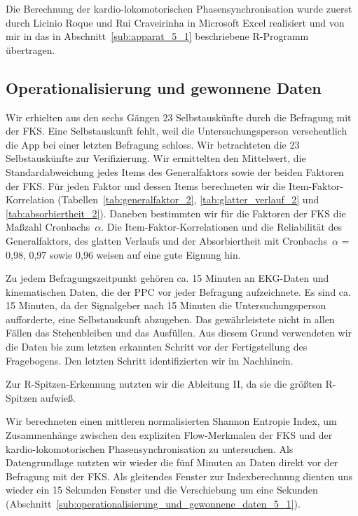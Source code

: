 Die Berechnung der kardio-lokomotorischen Phasensynchronisation wurde zuerst durch Licinio Roque und Rui Craveirinha in Microsoft Excel realisiert und von mir in das in Abschnitt~\ref{sub:apparat_5_1} beschriebene R-Programm übertragen. 

\subsection{Operationalisierung und gewonnene Daten} 

\label{sub:operationalisierung_und_gewonnene_daten_5_2}

Wir erhielten aus den sechs Gängen 23 Selbstauskünfte durch die Befragung mit der \ac{FKS}. Eine Selbstauskunft fehlt, weil die Untersuchungsperson versehentlich die App bei einer letzten Befragung schloss. Wir betrachteten die 23 Selbstauskünfte zur Verifizierung. Wir ermittelten den Mittelwert, die Standardabweichung jedes Items des Generalfaktors sowie der beiden Faktoren der \ac{FKS}. Für jeden Faktor und dessen Items berechneten wir die Item-Faktor-Korrelation (Tabellen~\ref{tab:generalfaktor_2}, \ref{tab:glatter_verlauf_2} und \ref{tab:absorbiertheit_2}). Daneben bestimmten wir für die Faktoren der \ac{FKS} die Maßzahl Cronbachs~$\alpha$. Die Item-Faktor-Korrelationen und die Reliabilität des Generalfaktors, des glatten Verlaufs und der Absorbiertheit mit Cronbachs~$\alpha$ = 0,98, 0,97 sowie 0,96 weisen auf eine gute Eignung hin. 

Zu jedem Befragungszeitpunkt gehören ca. 15 Minuten an \ac{EKG}-Daten und kinematischen Daten, die der \ac{PPC} vor jeder Befragung aufzeichnete. Es sind ca. 15 Minuten, da der Signalgeber nach 15 Minuten die Untersuchungsperson aufforderte, eine Selbstauskunft abzugeben. Das gewährleistete nicht in allen Fällen das Stehenbleiben und das Ausfüllen. Aus diesem Grund verwendeten wir die Daten bis zum letzten erkannten Schritt vor der Fertigstellung des Fragebogens. Den letzten Schritt identifizierten wir im Nachhinein. 

Zur R-Spitzen-Erkennung nutzten wir die Ableitung II, da sie die größten R-Spitzen aufwieß. 

Wir berechneten einen mittleren normalisierten Shannon Entropie Index, um Zusammenhänge zwischen den expliziten Flow-Merkmalen der \ac{FKS} und der kardio-lokomotorischen Phasensynchronisation zu untersuchen. Als Datengrundlage nutzten wir wieder die fünf Minuten an Daten direkt vor der Befragung mit der \ac{FKS}. Als gleitendes Fenster zur Indexberechnung dienten uns wieder ein 15 Sekunden Fenster und die Verschiebung um eine Sekunden (Abschnitt~\ref{sub:operationalisierung_und_gewonnene_daten_5_1}).

